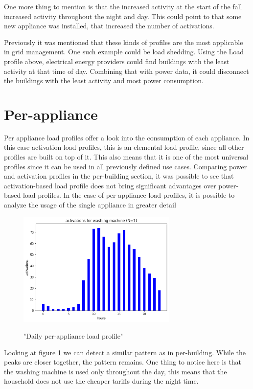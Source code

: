 One more thing to mention is that the increased activity at the start of the fall increased activity throughout the night and day.
This could point to that some new appliance was installed, that increased the number of activations.

Previously it was mentioned that these kinds of profiles are the most applicable in grid management. 
One such example could be load shedding.
Using the Load profile above, electrical energy providers could find buildings with the least activity at that time of day.
Combining that with power data, it could disconnect the buildings with the least activity and most power consumption.

\section{Per-appliance}

Per appliance load profiles offer a look into the consumption of each appliance. 
In this case activation load profiles, this is an elemental load profile, since all other 
profiles are built on top of it. 
This also means that it is one of the most universal profiles since it can be used in all previously defined use cases.
Comparing power and activation profiles in the per-building section,
it was possible to see that activation-based load profile does not bring significant advantages over power-based load profiles.
In the case of per-appliance load profiles, it is possible to analyze the usage of the single appliance in greater detail

\begin{figure}[H]
	\centering
	\caption{"Daily per-appliance load profile"}
	\includegraphics[width=0.7\textwidth]{../Figures/LPS/WM_daily.png}
	\label{fig:WM_daily}
\end{figure}

Looking at figure \ref{fig:WM_daily} we can detect a similar pattern as in per-building. 
While the peaks are closer together, the pattern remains.
One thing to notice here is that the washing machine is used only throughout the day, this means that the household does not use the cheaper tariffs during the night time.

